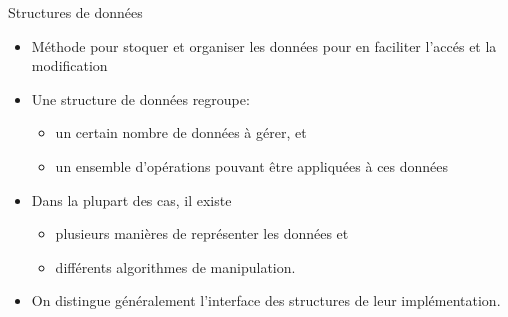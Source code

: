 





\begin{frame}{Structures de données}

\begin{itemize}
\item Méthode pour stoquer et organiser les données pour en faciliter
  l'accés et la modification
\item Une structure de données regroupe:
\begin{itemize}
\item un certain nombre de données à gérer, et
\item un ensemble d'opérations pouvant être appliquées à ces données
\end{itemize}
\item Dans la plupart des cas, il existe
\begin{itemize}
\item plusieurs manières de représenter les données et
\item différents algorithmes de manipulation.
\end{itemize}
\item On distingue généralement l'\alert{interface} des structures de
  leur \alert{implémentation}.
\end{itemize}

\end{frame}


